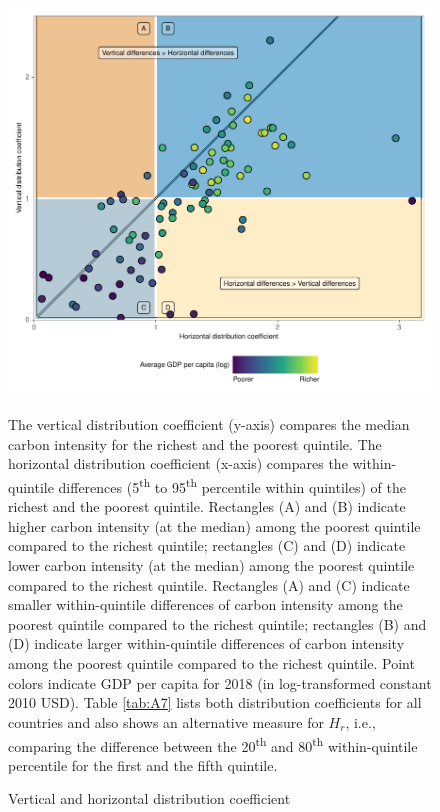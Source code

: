 \documentclass[12pt, a4paper]{article}
\newenvironment{subcaption2}
{\strut
\vspace{-5pt}
\begin{minipage}[b]{0.95\textwidth}
  \hspace*{-\parindent}
  \footnotesize}
 {\end{minipage}}
\begin{document}
\begin{figure}[ht!]
    \centering
    \includegraphics{Figure 2/Figure_2_2017_B.pdf}
    \caption{Vertical and horizontal distribution coefficient}
    \label{fig:fig_2}
    \begin{subcaption2}
    The vertical distribution coefficient (y-axis) compares the median carbon intensity for the richest and the poorest quintile. The horizontal distribution coefficient (x-axis) compares the within-quintile differences (5\textsuperscript{th} to 95\textsuperscript{th} percentile within quintiles) of the richest and the poorest quintile. Rectangles (A) and (B) indicate higher carbon intensity (at the median) among the poorest quintile compared to the richest quintile; rectangles (C) and (D) indicate lower carbon intensity (at the median) among the poorest quintile compared to the richest quintile. Rectangles (A) and (C) indicate smaller within-quintile differences of carbon intensity among the poorest quintile compared to the richest quintile; rectangles (B) and (D) indicate larger within-quintile differences of carbon intensity among the poorest quintile compared to the richest quintile. Point colors indicate GDP per capita for 2018 (in log-transformed constant 2010 USD). Table \ref{tab:A7} lists both distribution coefficients for all countries and also shows an alternative measure for $\widehat{H_{r}}$, i.e., comparing the difference between the 20\textsuperscript{th} and 80\textsuperscript{th} within-quintile percentile for the first and the fifth quintile.
    \end{subcaption2}
\end{figure}
\end{document}
